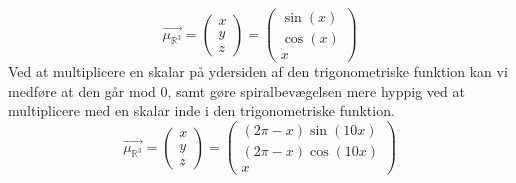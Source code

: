     \[
        \overrightarrow{\mu_{\mathbb{R}^3}}=
        \begin{pmatrix}
            x \\
            y \\
            z
        \end{pmatrix}=
        \begin{pmatrix}
            \sin(x) \\
            \cos(x) \\
            x
        \end{pmatrix}
    \]
    Ved at multiplicere en skalar på ydersiden af den trigonometriske funktion kan vi medføre at den går mod $0$, samt gøre spiralbevægelsen mere hyppig ved at multiplicere med en skalar inde i den trigonometriske funktion.
    \[
        \overrightarrow{\mu_{\mathbb{R}^3}}=
        \begin{pmatrix}
            x \\
            y \\
            z
        \end{pmatrix}=
        \begin{pmatrix}
            (2\pi-x)\sin(10x) \\
            (2\pi-x)\cos(10x) \\
            x
        \end{pmatrix}
    \]
